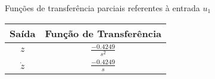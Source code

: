 \begin{quadro}[!htb]
    \centering
    \caption{Funções de transferência parciais referentes à entrada $u_1$\label{qua:resultados_quadro_tfs_u1}}
    \begin{tabular}{|c|c|}
        \hline
        \textbf{Saída} & 
        \textbf{Função de Transferência} \\
        \hline
            $z$ &
            $\frac{-0.4249}{s^2}$ \\[1ex]
        \hline
            $\dot{z}$ &
            $\frac{-0.4249}{s}$ \\[1ex]
        \hline
    \end{tabular}
\end{quadro}
